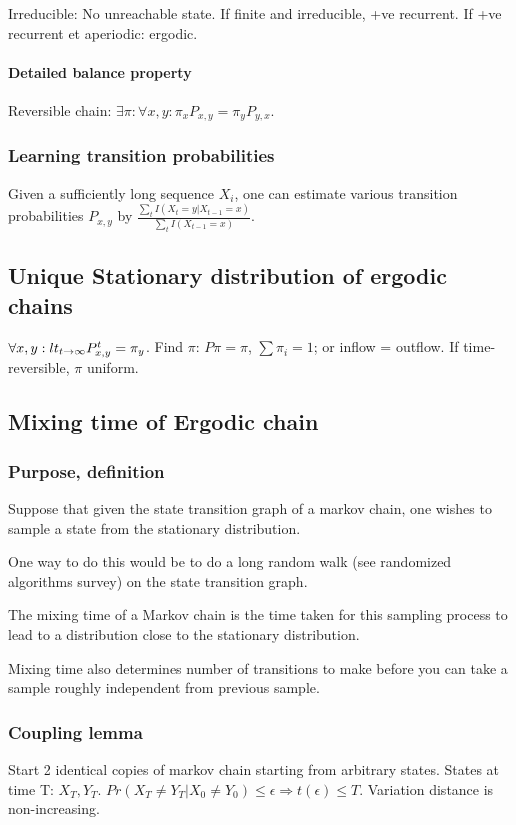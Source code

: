 \documentclass[oneside, article]{memoir}
\begin{document}
Irreducible: No unreachable state. If finite and irreducible, +ve recurrent. If +ve recurrent et aperiodic: ergodic.

\paragraph*{Detailed balance property}
Reversible chain: $\exists \pi: \forall x, y: \pi_{x}P_{x,y} = \pi_{y}P_{y,x}$.

\subsubsection{Learning transition probabilities}
Given a sufficiently long sequence $X_i$, one can estimate various transition probabilities $P_{x, y}$ by $\frac{\sum_t I(X_t = y| X_{t-1} = x)}{\sum_t I(X_{t-1}=x)}$.

\subsection{Unique Stationary distribution  of ergodic chains}
$\forall x, y: \\
lt_{t\to \infty}P^{t}_{x,y} = \pi_{y}$. Find $\pi$: $P\pi =\pi$, $\sum \pi_{i}=1$; or inflow = outflow. If time-reversible, $\pi$ uniform.

\subsection{Mixing time of Ergodic chain}
\subsubsection{Purpose, definition}
Suppose that given the state transition graph of a markov chain, one wishes to sample a state from the stationary distribution.

One way to do this would be to do a long random walk (see randomized algorithms survey) on the state transition graph.

The mixing time of a Markov chain is the time taken for this sampling process to lead to a distribution close to the stationary distribution.

Mixing time also determines number of transitions to make before you can take a sample roughly independent from previous sample.

\subsubsection{Coupling lemma}
Start 2 identical copies of markov chain starting from arbitrary states. States at time T: $X_{T}, Y_{T}$. $Pr(X_{T} \neq Y_{T}|X_{0}\neq Y_{0}) \leq \epsilon \Rightarrow t(\epsilon) \leq T$. Variation distance is non-increasing.
\end{document}
